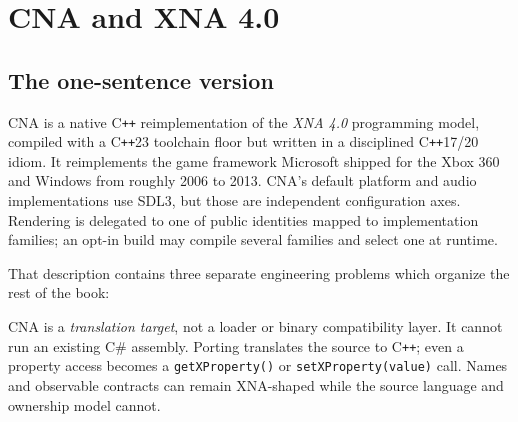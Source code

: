\chapter{CNA and XNA 4.0}
\label{ch:cna-xna}
\label{ch:what-is-cna}

\section{The one-sentence version}

CNA is a native C\texttt{++} reimplementation of the \emph{XNA 4.0} programming model, compiled
with a C\texttt{++}23 toolchain floor but written in a disciplined C\texttt{++}17/20 idiom. It
reimplements the game framework Microsoft shipped for the Xbox 360 and Windows from roughly 2006
to 2013. CNA's default platform and audio implementations use SDL3, but those are independent
configuration axes. Rendering is delegated to one of \RendererIdentityCount{} public identities
mapped to \RendererFamilyCount{} implementation families; an opt-in build may compile several
families and select one at runtime.

That description contains three separate engineering problems which organize the rest of the
book:

CNA is a \emph{translation target}, not a loader or binary compatibility layer.  It cannot run
an existing C\# assembly.  Porting translates the source to C\texttt{++}; even a property access
becomes a \texttt{getXProperty()} or \texttt{setXProperty(value)} call.  Names and observable
contracts can remain XNA-shaped while the source language and ownership model cannot.

